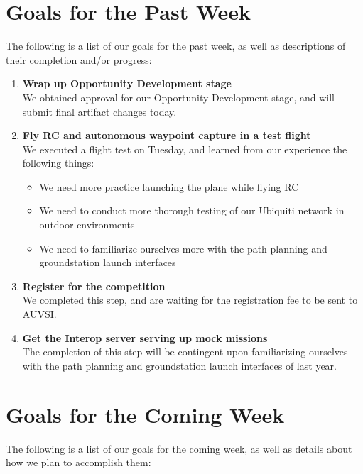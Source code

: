 \documentclass[]{../auvsi_doc}
\begin{document}
\section{Goals for the Past Week}

The following is a list of our goals for the past week, as well as descriptions of their completion and/or progress:

\begin{enumerate}
\item \textbf{Wrap up Opportunity Development stage}\\
We obtained approval for our Opportunity Development stage, and will submit final artifact changes today.
\item \textbf{Fly RC and autonomous waypoint capture in a test flight}\\
We executed a flight test on Tuesday, and learned from our experience the following things:
\begin{itemize}
\item We need more practice launching the plane while flying RC
\item We need to conduct more thorough testing of our Ubiquiti network in outdoor environments
\item We need to familiarize ourselves more with the path planning and groundstation launch interfaces
\end{itemize}
\item \textbf{Register for the competition}\\
We completed this step, and are waiting for the registration fee to be sent to AUVSI.
\item \textbf{Get the Interop server serving up mock missions}\\
The completion of this step will be contingent upon familiarizing ourselves with the path planning and groundstation launch interfaces of last year.
\end{enumerate}

\section{Goals for the Coming Week}

The following is a list of our goals for the coming week, as well as details about how we plan to accomplish them:
\end{document}

